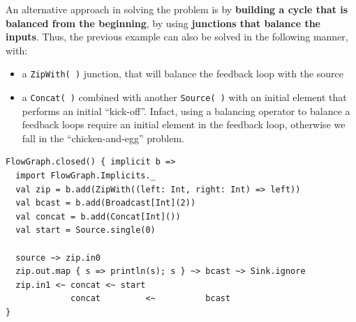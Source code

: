 An alternative approach in solving the problem is by \textbf{building a
cycle that is balanced from the beginning}, by using \textbf{junctions
that balance the inputs}. Thus, the previous example can also be solved
in the following manner, with:

\begin{itemize}
\itemsep1pt\parskip0pt
\item
  a \texttt{ZipWith(\ )} junction, that will balance the feedback loop
  with the source
\item
  a \texttt{Concat(\ )} combined with another \texttt{Source(\ )} with
  an initial element that performs an initial ``kick-off''. Infact,
  using a balancing operator to balance a feedback loops require an
  initial element in the feedback loop, otherwise we fall in the
  ``chicken-and-egg'' problem.
\end{itemize}

\begin{verbatim}
FlowGraph.closed() { implicit b =>
  import FlowGraph.Implicits._
  val zip = b.add(ZipWith((left: Int, right: Int) => left))
  val bcast = b.add(Broadcast[Int](2))
  val concat = b.add(Concat[Int]())
  val start = Source.single(0)

  source ~> zip.in0
  zip.out.map { s => println(s); s } ~> bcast ~> Sink.ignore
  zip.in1 <~ concat <~ start
             concat         <~          bcast
}
\end{verbatim}
